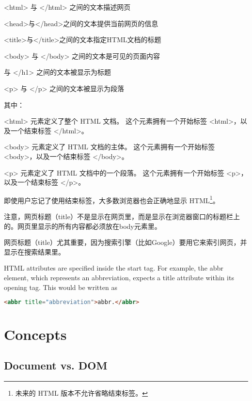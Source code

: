 \begin{compactitem}
\item <html> 与 </html> 之间的文本描述网页
\item <head>与</head>之间的文本提供当前网页的信息
\item <title>与</title>之间的文本指定HTML文档的标题
\item <body> 与 </body> 之间的文本是可见的页面内容
\item <h1> 与 </h1> 之间的文本被显示为标题
\item <p> 与 </p> 之间的文本被显示为段落
\end{compactitem}

其中：

\begin{compactitem}
\item <html> 元素定义了整个 HTML 文档。
这个元素拥有一个开始标签 <html>，以及一个结束标签 </html>。
\item <body> 元素定义了 HTML 文档的主体。
这个元素拥有一个开始标签 <body>，以及一个结束标签 </body>。
\item <p> 元素定义了 HTML 文档中的一个段落。
这个元素拥有一个开始标签 <p>，以及一个结束标签 </p>。
\item 即使用户忘记了使用结束标签，大多数浏览器也会正确地显示 HTML\footnote{未来的 HTML 版本不允许省略结束标签。}。
\end{compactitem}

注意，网页标题（title）不是显示在网页里，而是显示在浏览器窗口的标题栏上的。网页里显示的所有内容都必须放在body元素里。

网页标题（title）尤其重要，因为搜索引擎（比如Google）要用它来索引网页，并显示在搜索结果里。

HTML attributes are specified inside the start tag. For example, the abbr element, which represents an abbreviation, expects a title attribute within its opening tag. This would be written as


\begin{lstlisting}[language=HTML]
	<abbr title="abbreviation">abbr.</abbr>
\end{lstlisting}


\chapter{Concepts}


\section{Document vs. DOM}

